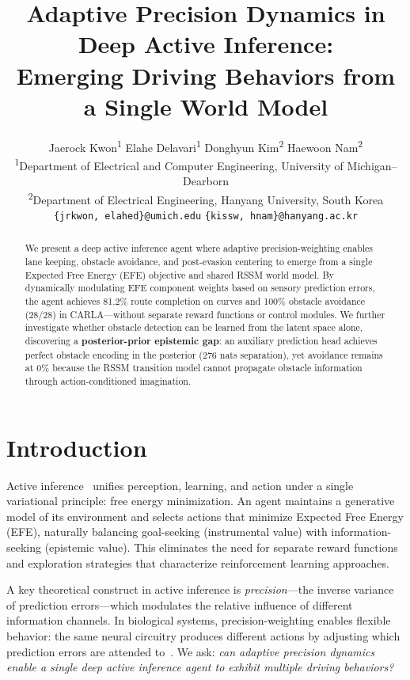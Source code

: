 \documentclass{article}
\title{Adaptive Precision Dynamics in Deep Active Inference:\\
Emerging Driving Behaviors from a Single World Model}
\author{
Jaerock Kwon\textsuperscript{1} \quad
Elahe Delavari\textsuperscript{1} \quad
Donghyun Kim\textsuperscript{2} \quad
Haewoon Nam\textsuperscript{2} \\[4pt]
\textsuperscript{1}Department of Electrical and Computer Engineering,
University of Michigan--Dearborn \\
\textsuperscript{2}Department of Electrical Engineering,
Hanyang University, South Korea \\[2pt]
\texttt{\{jrkwon, elahed\}@umich.edu} \quad
\texttt{\{kissw, hnam\}@hanyang.ac.kr}
}
\date{}
\begin{document}
\maketitle

\begin{abstract}
We present a deep active inference agent where adaptive
precision-weighting enables lane keeping, obstacle avoidance, and
post-evasion centering to emerge from a single Expected Free Energy
(EFE) objective and shared RSSM world model. By dynamically
modulating EFE component weights based on sensory prediction errors,
the agent achieves 81.2\% route completion on curves and 100\%
obstacle avoidance (28/28) in CARLA---without separate reward
functions or control modules. We further investigate whether obstacle
detection can be learned from the latent space alone, discovering a
\textbf{posterior-prior epistemic gap}: an auxiliary prediction head
achieves perfect obstacle encoding in the posterior (276 nats
separation), yet avoidance remains at 0\% because the RSSM
transition model cannot propagate obstacle information through
action-conditioned imagination.
\end{abstract}

\section{Introduction}

Active inference~\citep{friston2010free, parr2022active} unifies
perception, learning, and action under a single variational
principle: free energy minimization. An agent maintains a generative
model of its environment and selects actions that minimize Expected
Free Energy (EFE), naturally balancing goal-seeking (instrumental
value) with information-seeking (epistemic value). This eliminates
the need for separate reward functions and exploration strategies
that characterize reinforcement learning approaches.

A key theoretical construct in active inference is
\emph{precision}---the inverse variance of prediction errors---which
modulates the relative influence of different information channels.
In biological systems, precision-weighting enables flexible behavior:
the same neural circuitry produces different actions by adjusting
which prediction errors are attended to~\citep{parr2022active}. We
ask: \emph{can adaptive precision dynamics enable a single deep
active inference agent to exhibit multiple driving behaviors?}
\end{document}
